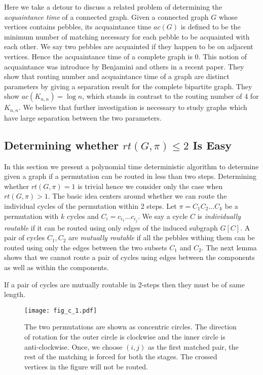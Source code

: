 \documentclass[runningheads,a4paper]{llncs}
\begin{document}
Here we take a detour to discuss a related problem of determining the \textit{acquaintance time} of a connected graph. Given a connected graph $G$ whose vertices contains pebbles, its acquaintance time $ac(G)$ is defined to be the minimum number of matching necessary for each pebble to be acquainted with  each other. We say two pebbles are acquainted if they happen to be on adjacent vertices. Hence the acquaintance time of a complete graph is 0. This notion  of acquaintance  was introduce by Benjamini and others in a recent paper\cite{9}. They show that routing number and acquaintance time of a graph are distinct parameters by giving a separation result for the complete bipartite graph. They show $ac(K_{n,n}) = \log n$, which stands in  contrast to the routing number of 4 for $K_{n,n}$. We believe that further investigation is necessary to study graphs which have large separation between the two parameters.

\subsection{Determining whether $rt(G,\pi) \le 2$ Is Easy}
In this section we present a polynomial time deterministic algorithm to determine given a graph if a permutation can be routed in less than two steps. Determining whether $rt(G,\pi) = 1$ is trivial hence we consider only the case when $rt(G,\pi) > 1$.  The basic idea centers around whether we can route the individual cycles of the permutation within 2 steps. Let $\pi = C_1C_2\ldots C_k$ be a permutation with $k$ cycles and $C_i = c_{i_1}\ldots c_{i_j}$. We say a cycle $C$ is  \textit{individually routable } if it can be routed using only edges of the induced subgraph $G[C]$. A pair of cycles $C_1,C_2$ are \textit{mutually routable} if all the pebbles withing them can be routed using only the edges between the two subsets $C_1$ and $C_2$. The next lemma shows that we cannot route  a pair of cycles using edges between the components as well as within the components.

\begin{lemma}
	If a pair of cycles are mutually routable in 2-steps then they must be of same length.
\end{lemma}

\begin{figure}[h]
	\texttt{[image: fig\_c\_1.pdf]}
	\centering
	\caption{The two permutations are shown as concentric circles. The direction of rotation for the outer circle is clockwise and the inner circle is anti-clockwise. Once, we choose $(i,j)$ as the first matched pair, the rest of the matching is forced for both the stages. The crossed vertices in the figure will not be routed.} 
\end{figure}
\end{document}

